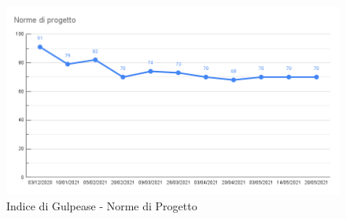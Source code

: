 \begin{figure}[H]
    \centering
    \includegraphics[width=13 cm]{source/sections/images/IdG_NdP.png}
    \caption{Indice di Gulpease - Norme di Progetto}
\end{figure}

